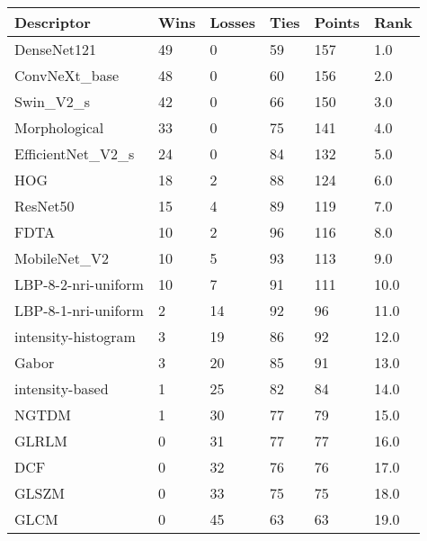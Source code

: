 \begin{tabular}{llllll}\\ 
\toprule
Descriptor & Wins & Losses & Ties & Points & Rank\\ 
\midrule
DenseNet121 & 49 & 0 & 59 & 157 & 1.0\\ 
ConvNeXt_base & 48 & 0 & 60 & 156 & 2.0\\ 
Swin_V2_s & 42 & 0 & 66 & 150 & 3.0\\ 
Morphological & 33 & 0 & 75 & 141 & 4.0\\ 
EfficientNet_V2_s & 24 & 0 & 84 & 132 & 5.0\\ 
HOG & 18 & 2 & 88 & 124 & 6.0\\ 
ResNet50 & 15 & 4 & 89 & 119 & 7.0\\ 
FDTA & 10 & 2 & 96 & 116 & 8.0\\ 
MobileNet_V2 & 10 & 5 & 93 & 113 & 9.0\\ 
LBP-8-2-nri-uniform & 10 & 7 & 91 & 111 & 10.0\\ 
LBP-8-1-nri-uniform & 2 & 14 & 92 & 96 & 11.0\\ 
intensity-histogram & 3 & 19 & 86 & 92 & 12.0\\ 
Gabor & 3 & 20 & 85 & 91 & 13.0\\ 
intensity-based & 1 & 25 & 82 & 84 & 14.0\\ 
NGTDM & 1 & 30 & 77 & 79 & 15.0\\ 
GLRLM & 0 & 31 & 77 & 77 & 16.0\\ 
DCF & 0 & 32 & 76 & 76 & 17.0\\ 
GLSZM & 0 & 33 & 75 & 75 & 18.0\\ 
GLCM & 0 & 45 & 63 & 63 & 19.0\\ 
\bottomrule
\end{tabular}
